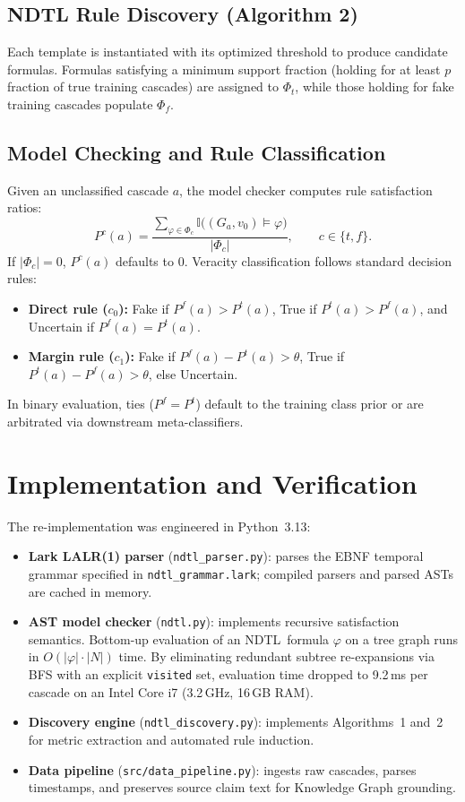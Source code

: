 \documentclass[10pt,twocolumn,a4paper]{article}
\newcommand{\NDTL}{\textsc{NDTL}}
\begin{document}
\subsection{NDTL Rule Discovery (Algorithm 2)}
Each template is instantiated with its optimized threshold to produce candidate formulas. Formulas satisfying a minimum support fraction (holding for at least $p$ fraction of true training cascades) are assigned to $\Phi_t$, while those holding for fake training cascades populate $\Phi_f$.
 
\subsection{Model Checking and Rule Classification}
Given an unclassified cascade $a$, the model checker computes rule satisfaction ratios:
\begin{equation}
P^{c}(a)=\frac{\sum_{\varphi\in\Phi_c}\mathbb{I}\big((G_a,v_0)\models\varphi\big)}{|\Phi_c|},\qquad c\in\{t,f\}.
\end{equation}
If $|\Phi_c| = 0$, $P^c(a)$ defaults to $0$. Veracity classification follows standard decision rules:
\begin{itemize}
  \item \textbf{Direct rule ($c_0$):} Fake if $P^f(a)>P^t(a)$, True if $P^t(a)>P^f(a)$, and Uncertain if $P^f(a) = P^t(a)$.
  \item \textbf{Margin rule ($c_1$):} Fake if $P^f(a)-P^t(a)>\theta$, True if $P^t(a)-P^f(a)>\theta$, else Uncertain.
\end{itemize}
In binary evaluation, ties ($P^f = P^t$) default to the training class prior or are arbitrated via downstream meta-classifiers.
 
\section{Implementation and Verification}
The re-implementation was engineered in Python~3.13:
\begin{itemize}
  \item \textbf{Lark LALR(1) parser} (\texttt{ndtl\_parser.py}): parses the EBNF temporal grammar specified in \texttt{ndtl\_grammar.lark}; compiled parsers and parsed ASTs are cached in memory.
  \item \textbf{AST model checker} (\texttt{ndtl.py}): implements recursive satisfaction semantics. Bottom-up evaluation of an \NDTL\ formula $\varphi$ on a tree graph runs in $O(|\varphi| \cdot |N|)$ time. By eliminating redundant subtree re-expansions via BFS with an explicit \texttt{visited} set, evaluation time dropped to 9.2\,ms per cascade on an Intel Core i7 (3.2\,GHz, 16\,GB RAM).
  \item \textbf{Discovery engine} (\texttt{ndtl\_discovery.py}): implements Algorithms~1 and~2 for metric extraction and automated rule induction.
  \item \textbf{Data pipeline} (\texttt{src/data\_pipeline.py}): ingests raw cascades, parses timestamps, and preserves source claim text for Knowledge Graph grounding.
\end{itemize}
 
\end{document}
